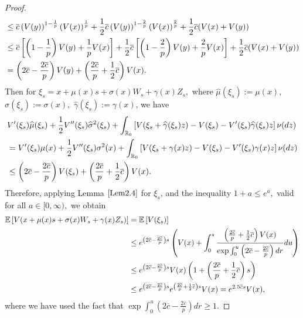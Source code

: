 \documentclass[11pt]{article}
\theoremstyle{theorem}
\theoremstyle{definition}
\newcommand{\bR}{\mathbb{R}}
\newcommand{\1}{{\bf 1}}
\begin{document}
\begin{proof}
\begin{align*}
&  \leq \overline{c} \left(V(y)\right)^{1-\frac{1}{p}} \left(V(x)\right)^{\frac{1}{p}}  +\dfrac{1}{2} \overline{c} \left(V(y)\right)^{1-\frac{2}{p}}  \left(V(x)\right)^{\frac{2}{p}}  +\dfrac{1}{2}  \overline{c} (V(x) + V(y)) \notag \\
&  \leq \overline{c}  \left[ \left(1-\dfrac{1}{p} \right) V(y)+ \dfrac{1}{p} V(x)\right] +\dfrac{1}{2} \overline{c}  \left[ \left(1-\dfrac{2}{p} \right) V(y)+ \dfrac{2}{p} V(x)\right] +\dfrac{1}{2}  \overline{c} (V(x) + V(y)) \notag \\
&=  \left(2  \overline{c} -\dfrac{2\overline{c}}{p}\right) V(y)+ \left(\dfrac{2\overline{c}}{p} +\dfrac{1}{2}\overline{c} \right)V(x).
    \end{align*}
Then for $\xi_s=x+\mu(x)s+\sigma(x)W_s+\gamma(x)Z_s,$ where $ \widehat{\mu}(\xi_s):=\mu(x),$ $\widehat{\sigma}(\xi_s) := \sigma(x),$ $ \widehat{\gamma}(\xi_s) := \gamma(x)$, we have 
\begin{align}
& V'(\xi_s) \widehat{\mu}(\xi_s)+\dfrac{1}{2} V''(\xi_s) \widehat{\sigma}^2 (\xi_s) + \int_{\bR_0} \left[ V(\xi_s +\widehat{\gamma}(\xi_s)z)-V(\xi_s)-V'(\xi_s) \widehat{\gamma}(\xi_s)z\right] \nu (dz) \notag \\
  & = V'(\xi_s) \mu(x)+\dfrac{1}{2} V''(\xi_s) \sigma^2 (x) + \int_{\bR_0} \left[ V(\xi_s +\gamma(x)z)-V(\xi_s)-V'(\xi_s)\gamma(x)z\right] \nu (dz) \notag \\
 &\le  \left(2  \overline{c} -\dfrac{2\overline{c}}{p}\right) V(\xi_s)+ \left(\dfrac{2\overline{c}}{p} +\dfrac{1}{2}\overline{c} \right)V(x). 
\end{align}  
Therefore, applying Lemma $\ref{Lem2.4}$ for  $\xi_s$, and the inequality $1+a \le e^a,$ valid for all $a \in [0, \infty),$ we obtain
\begin{align}
  \mathbb{E}\left[ V(x+ \mu (x)s + \sigma (x)W_s+\gamma(x)Z_s)\right] 
 &= \mathbb{E}\left[ V (\xi_s) \right] \notag \\ 
 &\leq e^{\left(2 \overline{c} -\frac{2\overline{c}}{p}\right)s} \left( V(x)+ \int_0^s \dfrac{\left(\frac{2\overline{c}}{p} +\frac{1}{2}\overline{c} \right)V(x)}{ \exp \int_0^u \left(2 \overline{c} -\frac{2\overline{c}}{p}\right)dr}du \right) \notag \\
 & \leq e^{\left(2 \overline{c} -\frac{2\overline{c}}{p}\right)s} V(x) \left( 1+\left(\frac{2\overline{c}}{p} +\frac{1}{2} \overline{c} \right)s \right) \notag\\
 & \leq e^{\left(2 \overline{c} -\frac{2\overline{c}}{p}\right)s} e^{\left(\frac{2\overline{c}}{p} +\frac{1}{2} \overline{c} \right)s} V(x)= e^{2.5 \overline{c}s} V(x),
 \label{i2}
\end{align}
where we have used the fact that $\exp \int_0^u \left(2 \overline{c} -\frac{2\overline{c}}{p}\right)dr \ge 1.$


\end{proof}
\end{document}
